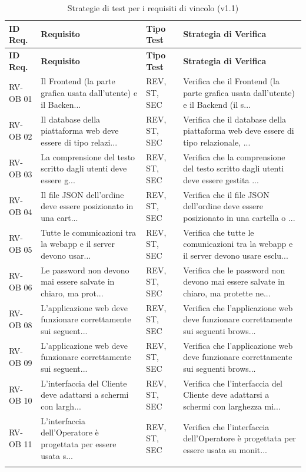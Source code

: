 \documentclass[a4paper,11pt,oneside]{scrartcl}
\begin{document}
\begin{longtable}{|p{1.5cm}|p{5.5cm}|p{1.8cm}|p{5cm}|}
    \hline
    \textbf{ID Req.} & \textbf{Requisito}                                              & \textbf{Tipo Test} & \textbf{Strategia di Verifica}                                                      \\
    \hline
    \endfirsthead
    \hline
    \textbf{ID Req.} & \textbf{Requisito}                                              & \textbf{Tipo Test} & \textbf{Strategia di Verifica}                                                      \\
    \hline
    \endhead

    RV-OB 01         & Il Frontend (la parte grafica usata dall'utente) e il Backen... & REV, ST, SEC       & Verifica che il Frontend (la parte grafica usata dall'utente) e il Backend (il s... \\ \hline
    RV-OB 02         & Il database della piattaforma web deve essere di tipo relazi... & REV, ST, SEC       & Verifica che il database della piattaforma web deve essere di tipo relazionale, ... \\ \hline
    RV-OB 03         & La comprensione del testo scritto dagli utenti deve essere g... & REV, ST, SEC       & Verifica che la comprensione del testo scritto dagli utenti deve essere gestita ... \\ \hline
    RV-OB 04         & Il file JSON dell'ordine deve essere posizionato in una cart... & REV, ST, SEC       & Verifica che il file JSON dell'ordine deve essere posizionato in una cartella o ... \\ \hline
    RV-OB 05         & Tutte le comunicazioni tra la webapp e il server devono usar... & REV, ST, SEC       & Verifica che tutte le comunicazioni tra la webapp e il server devono usare esclu... \\ \hline
    RV-OB 06         & Le password non devono mai essere salvate in chiaro, ma prot... & REV, ST, SEC       & Verifica che le password non devono mai essere salvate in chiaro, ma protette ne... \\ \hline
    RV-OB 08         & L'applicazione web deve funzionare correttamente sui seguent... & REV, ST, SEC       & Verifica che l'applicazione web deve funzionare correttamente sui seguenti brows... \\ \hline
    RV-OB 09         & L'applicazione web deve funzionare correttamente sui seguent... & REV, ST, SEC       & Verifica che l'applicazione web deve funzionare correttamente sui seguenti brows... \\ \hline
    RV-OB 10         & L'interfaccia del Cliente deve adattarsi a schermi con largh... & REV, ST, SEC       & Verifica che l'interfaccia del Cliente deve adattarsi a schermi con larghezza mi... \\ \hline
    RV-OB 11         & L'interfaccia dell'Operatore è progettata per essere usata s... & REV, ST, SEC       & Verifica che l'interfaccia dell'Operatore è progettata per essere usata su monit... \\ \hline
    \caption{Strategie di test per i requisiti di vincolo (v1.1)}
\end{longtable}
\end{document}
